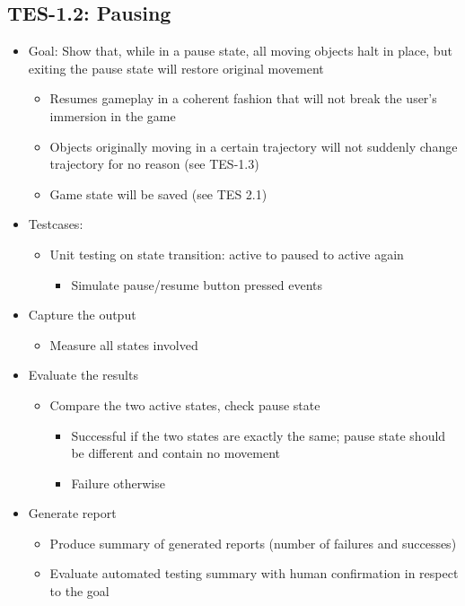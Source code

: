 \subsection{TES-1.2: Pausing}
\begin{itemize}
\item Goal: Show that, while in a pause state, all moving objects halt in place, but exiting the pause state will restore original movement
\begin{itemize}
\item Resumes gameplay in a coherent fashion that will not break the user\textquoteright{}s immersion in the game
\item Objects originally moving in a certain trajectory will not suddenly change trajectory for no reason (see TES-1.3)
\item Game state will be saved (see TES 2.1)
\end{itemize}

\item Testcases:
\begin{itemize}
\item Unit testing on state transition: active to paused to active again
\begin{itemize}
\item Simulate pause/resume button pressed events
\end{itemize}
\end{itemize}

\item Capture the output
\begin{itemize}
\item Measure all states involved
\end{itemize}

\item Evaluate the results
\begin{itemize}
\item Compare the two active states, check pause state
\begin{itemize}
\item Successful if the two states are exactly the same; pause state should be different and contain no movement
\item Failure otherwise
\end{itemize}
\end{itemize}

\item Generate report
\begin{itemize}
\item Produce summary of generated reports (number of failures and successes)
\item Evaluate automated testing summary with human confirmation in respect to the goal
\end{itemize}
\end{itemize}

